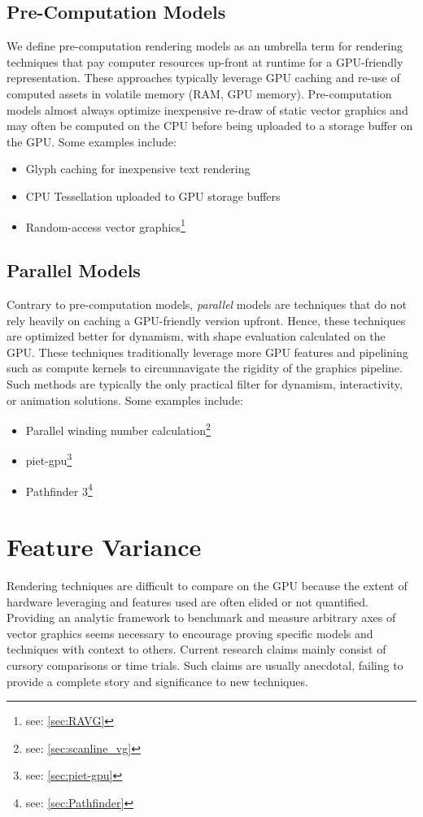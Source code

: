\subsection{Pre-Computation Models}\label{sec:precomp_models}
We define pre-computation rendering models as an umbrella term for rendering techniques that pay computer resources up-front at runtime for a GPU-friendly representation. These approaches typically leverage GPU caching and re-use of computed assets in volatile memory (RAM, GPU memory). Pre-computation models almost always optimize inexpensive re-draw of static vector graphics and may often be computed on the CPU before being uploaded to a storage buffer on the GPU. Some examples include:
\begin{itemize}
    \item Glyph caching for inexpensive text rendering
    \item CPU Tessellation uploaded to GPU storage buffers
    \item Random-access vector graphics\footnote{see: \cref{sec:RAVG}}
\end{itemize}

\subsection{Parallel Models}\label{sec:parallel_models}

Contrary to pre-computation models, \textit{parallel} models are techniques that do not rely heavily on caching a GPU-friendly version upfront. Hence, these techniques are optimized better for dynamism, with shape evaluation calculated on the GPU. These techniques traditionally leverage more GPU features and pipelining such as compute kernels to circumnavigate the rigidity of the graphics pipeline. Such methods are typically the only practical filter for dynamism, interactivity, or animation solutions. Some examples include:
\begin{itemize}
    \item Parallel winding number calculation\footnote{see: \cref{sec:scanline_vg}}
    \item piet-gpu\footnote{see: \cref{sec:piet-gpu}}
    \item Pathfinder 3\footnote{see: \cref{sec:Pathfinder}}
\end{itemize}

\section{Feature Variance}
Rendering techniques are difficult to compare on the GPU because the extent of hardware leveraging and features used are often elided or not quantified. Providing an analytic framework to benchmark and measure arbitrary axes of vector graphics seems necessary to encourage proving specific models and techniques with context to others. Current research claims mainly consist of cursory comparisons or time trials. Such claims are usually anecdotal, failing to provide a complete story and significance to new techniques.\medskip

